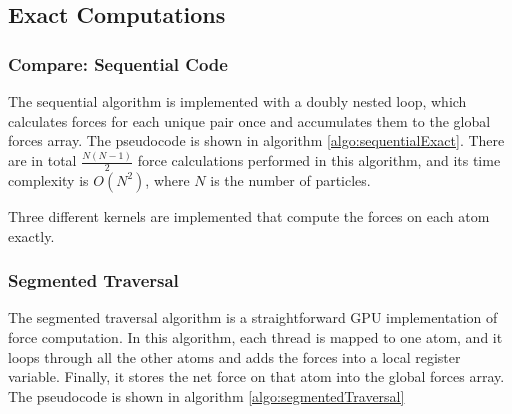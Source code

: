 \documentclass[12pt]{article}
\begin{document}
\subsection{Exact Computations}
\subsubsection{Compare: Sequential Code}
The sequential algorithm is implemented with a doubly nested loop, which calculates forces for each unique pair once and accumulates them to the global forces array. The pseudocode is shown in algorithm \ref{algo:sequentialExact}. There are in total $\frac{N(N-1)}{2}$ force calculations performed in this algorithm, and its time complexity is $O(N^2)$, where $N$ is the number of particles.
\begin{algorithm}
\caption{Sequential Exact Computations} \label{algo:sequentialExact}
\begin{algorithmic}[1]
    \EndFor
\EndFor
\end{algorithmic}
\end{algorithm}

Three different kernels are implemented that compute the forces on each atom exactly.

\subsubsection{Segmented Traversal}
The segmented traversal algorithm is a straightforward GPU implementation of force computation. In this algorithm, each thread is mapped to one atom, and it loops through all the other atoms and adds the forces into a local register variable. Finally, it stores the net force on that atom into the global forces array. The pseudocode is shown in algorithm \ref{algo:segmentedTraversal}
\end{document}
